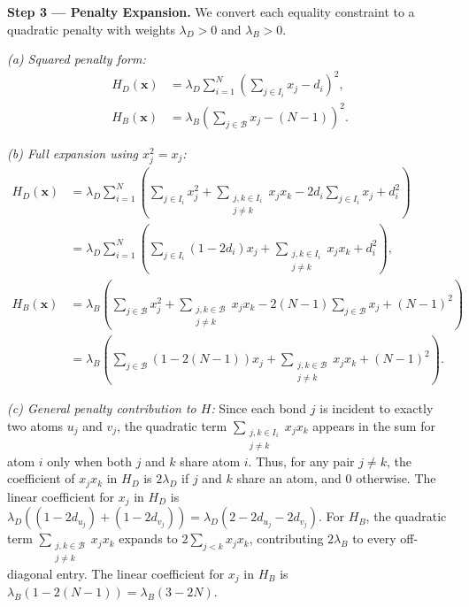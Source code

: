 \documentclass[12pt]{article}
\begin{document}
\textbf{Step 3 --- Penalty Expansion.} We convert each equality constraint to a quadratic penalty with weights $\lambda_D > 0$ and $\lambda_B > 0$.

\textit{(a) Squared penalty form:}
\begin{align}
H_D(\mathbf{x}) &= \lambda_D \sum_{i=1}^N \left( \sum_{j \in I_i} x_j - d_i \right)^2, \\
H_B(\mathbf{x}) &= \lambda_B \left( \sum_{j \in \mathcal{B}} x_j - (N-1) \right)^2.
\end{align}

\textit{(b) Full expansion using $x_j^2 = x_j$:}
\begin{align}
H_D(\mathbf{x}) &= \lambda_D \sum_{i=1}^N \left( \sum_{j \in I_i} x_j^2 + \sum_{\substack{j,k \in I_i \\ j \neq k}} x_j x_k - 2d_i \sum_{j \in I_i} x_j + d_i^2 \right) \nonumber \\
&= \lambda_D \sum_{i=1}^N \left( \sum_{j \in I_i} (1 - 2d_i) x_j + \sum_{\substack{j,k \in I_i \\ j \neq k}} x_j x_k + d_i^2 \right), \\
H_B(\mathbf{x}) &= \lambda_B \left( \sum_{j \in \mathcal{B}} x_j^2 + \sum_{\substack{j,k \in \mathcal{B} \\ j \neq k}} x_j x_k - 2(N-1)\sum_{j \in \mathcal{B}} x_j + (N-1)^2 \right) \nonumber \\
&= \lambda_B \left( \sum_{j \in \mathcal{B}} (1 - 2(N-1)) x_j + \sum_{\substack{j,k \in \mathcal{B} \\ j \neq k}} x_j x_k + (N-1)^2 \right).
\end{align}

\textit{(c) General penalty contribution to $H$:}
Since each bond $j$ is incident to exactly two atoms $u_j$ and $v_j$, the quadratic term $\sum_{\substack{j,k \in I_i \\ j \neq k}} x_j x_k$ appears in the sum for atom $i$ only when both $j$ and $k$ share atom $i$. Thus, for any pair $j \neq k$, the coefficient of $x_j x_k$ in $H_D$ is $2\lambda_D$ if $j$ and $k$ share an atom, and $0$ otherwise. The linear coefficient for $x_j$ in $H_D$ is $\lambda_D \left( (1 - 2d_{u_j}) + (1 - 2d_{v_j}) \right) = \lambda_D (2 - 2d_{u_j} - 2d_{v_j})$. For $H_B$, the quadratic term $\sum_{\substack{j,k \in \mathcal{B} \\ j \neq k}} x_j x_k$ expands to $2 \sum_{j < k} x_j x_k$, contributing $2\lambda_B$ to every off-diagonal entry. The linear coefficient for $x_j$ in $H_B$ is $\lambda_B (1 - 2(N-1)) = \lambda_B (3 - 2N)$.
\end{document}
